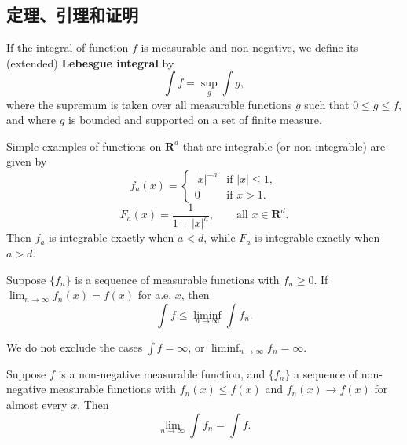 \subsection{定理、引理和证明}

\begin{definition}
  If the integral of function $f$ is measurable and non-negative, we define
  its (extended) \textbf{Lebesgue integral} by
  \begin{equation}
  \int f = \sup_g \int g,
  \end{equation}
  where the supremum is taken over all measurable functions $g$ such that
  $0 \leq g \leq f$, and where $g$ is bounded and supported on a set of
  finite measure.
\end{definition}

\begin{example}
  Simple examples of functions on $\mathbf{R}^d$ that are integrable
  (or non-integrable) are given by
  \begin{equation}
  f_a(x) =
  \begin{cases}
  |x|^{-a} & \text{if } |x| \leq 1,\\
  0 & \text{if } x > 1.
  \end{cases}
  \end{equation}
  \begin{equation}
  F_a(x) = \frac{1}{1 + |x|^a}, \qquad \text{all } x \in \mathbf{R}^d.
  \end{equation}
  Then $f_a$ is integrable exactly when $a < d$, while $F_a$ is integrable
  exactly when $a > d$.
\end{example}

\begin{lemma}[Fatou]
  Suppose $\{f_n\}$ is a sequence of measurable functions with $f_n \geq 0$.
  If $\lim_{n \to \infty} f_n(x) = f(x)$ for a.e. $x$, then
  \begin{equation}
  \int f \leq \liminf_{n \to \infty} \int f_n.
  \end{equation}
\end{lemma}

\begin{remark}
  We do not exclude the cases $\int f = \infty$,
  or $\liminf_{n \to \infty} f_n = \infty$.
\end{remark}

\begin{corollary}
  Suppose $f$ is a non-negative measurable function, and $\{f_n\}$ a sequence
  of non-negative measurable functions with
  $f_n(x) \leq f(x)$ and $f_n(x) \to f(x)$ for almost every $x$. Then
  \begin{equation}
  \lim_{n \to \infty} \int f_n = \int f.
  \end{equation}
\end{corollary}

